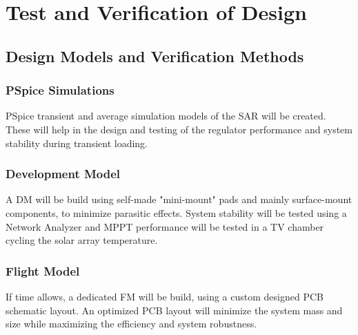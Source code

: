 \section{Test and Verification of Design}
\label{sec:test_verification}



\subsection{Design Models and Verification Methods}

\subsubsection*{PSpice Simulations}
PSpice transient and average simulation models of the \ac{SAR} will be created. These will help in the design and testing of the regulator performance and system stability during transient loading.

\subsubsection*{Development Model}
A \ac{DM} will be build using self-made "mini-mount" pads and mainly surface-mount components, to minimize parasitic effects. System stability will be tested using a Network Analyzer and MPPT performance will be tested in a \ac{TV} chamber cycling the solar array temperature.

\subsubsection*{Flight Model}
If time allows, a dedicated \ac{FM} will be build, using a custom designed \ac{PCB} schematic layout. An optimized \ac{PCB} layout will minimize the system mass and size while maximizing the efficiency and system robustness.
